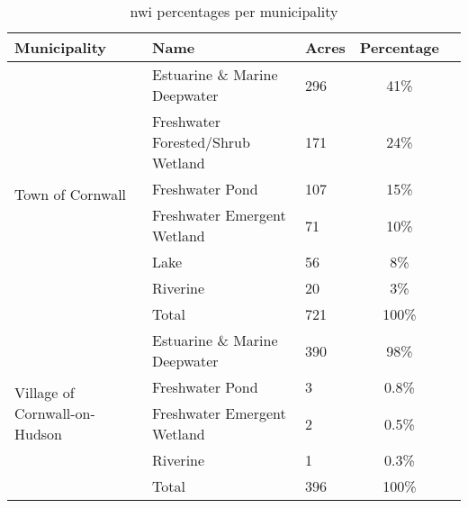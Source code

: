 \begin{table}[h]
    \centering
    \begin{tabular}{l l l c c }
    Municipality & Name & Acres & Percentage \\
    \hline
    \multirow{7}{*}{Town of Cornwall}
    & Estuarine \& Marine Deepwater & 296 & 41\%  &\\
    & Freshwater Forested/Shrub Wetland & 171  & 24\%  &\\
    & Freshwater Pond & 107 & 15\% &\\
    & Freshwater Emergent Wetland & 71 & 10\% & \\
   	& Lake & 56 & 8\% &\\ 
    & Riverine & 20 & 3\% &\\
    & Total & 721 & 100\% &\\
    \hline
    \multirow{5}{*}{Village of Cornwall-on-Hudson}
    & Estuarine \& Marine Deepwater & 390 & 98\%  &\\
    & Freshwater Pond & 3 & 0.8\% &\\
    & Freshwater Emergent Wetland & 2 & 0.5\% & \\
    & Riverine & 1 & 0.3\% &\\
    & Total & 396 & 100\% &\\
    \end{tabular}
    \caption{\gls{nwi} percentages per municipality}
    \label{tab:cornwall_nwi}
\end{table}


